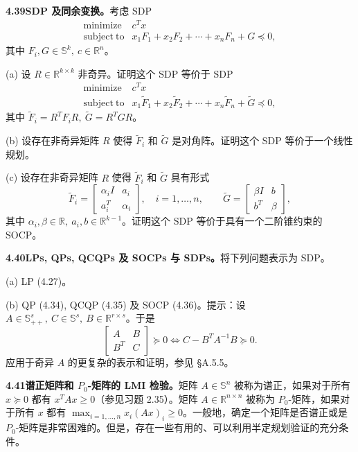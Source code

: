 \documentclass[UTF8, 12pt, fontset=fandol, oneside]{ctexart}
\begin{document}
\noindent\textbf{4.39\quad SDP 及同余变换。}\quad 考虑 SDP
\[
\begin{array}{ll}
\mathop{\mathrm{minimize}} & c^Tx\\
\mathrm{subject\ to} & x_1F_1+x_2F_2+\cdots+x_nF_n+G\preceq0,
\end{array}
\]
其中 $F_i,G\in\mathbb{S}^k,\ c\in\mathbb{R}^n$。

(a) 设 $R\in\mathbb{R}^{k\times k}$ 非奇异。证明这个 SDP 等价于 SDP
\[
\begin{array}{ll}
\mathop{\mathrm{minimize}} & c^Tx\\
\mathrm{subject\ to} & x_1\widetilde F_1+x_2\widetilde F_2+\cdots+x_n\widetilde F_n+\widetilde G\preceq0,
\end{array}
\]
其中 $\widetilde F_i=R^TF_iR,\ \widetilde G=R^TGR$。

(b) 设存在非奇异矩阵 $R$ 使得 $\widetilde F_i$ 和 $\widetilde G$ 是对角阵。证明这个 SDP 等价于一个线性规划。

(c) 设存在非奇异矩阵 $R$ 使得 $\widetilde F_i$ 和 $\widetilde G$ 具有形式
\[
\widetilde F_i=\begin{bmatrix}\alpha_iI&a_i\\a_i^T&\alpha_i\end{bmatrix},\quad i=1,\ldots,n,\qquad
\widetilde G=\begin{bmatrix}\beta I&b\\b^T&\beta\end{bmatrix},
\]
其中 $\alpha_i,\beta\in\mathbb{R},\ a_i,b\in\mathbb{R}^{k-1}$。证明这个 SDP 等价于具有一个二阶锥约束的 SOCP。

\noindent\textbf{4.40\quad LPs, QPs, QCQPs 及 SOCPs 与 SDPs。}\quad 将下列问题表示为 SDP。

(a) LP (4.27)。

(b) QP (4.34), QCQP (4.35) 及 SOCP (4.36)。提示：设 $A\in\mathbb{S}_{++}^s,\ C\in\mathbb{S}^s,\ B\in\mathbb{R}^{r\times s}$。于是
\[
\begin{bmatrix}A&B\\B^T&C\end{bmatrix}\succeq0\Longleftrightarrow C-B^TA^{-1}B\succeq0.
\]
应用于奇异 $A$ 的更复杂的表示和证明，参见 \S A.5.5。

\noindent\textbf{4.41\quad 谱正矩阵和 $P_0$-矩阵的 LMI 检验。}\quad 矩阵 $A\in\mathbb{S}^n$ 被称为谱正，如果对于所有 $x\succeq0$ 都有 $x^TAx\geq0$（参见习题 2.35）。矩阵 $A\in\mathbb{R}^{n\times n}$ 被称为 $P_0$-矩阵，如果对于所有 $x$ 都有 $\max_{i=1,\ldots,n}x_i(Ax)_i\geq0$。一般地，确定一个矩阵是否谱正或是 $P_0$-矩阵是非常困难的。但是，存在一些有用的、可以利用半定规划验证的充分条件。
\end{document}
